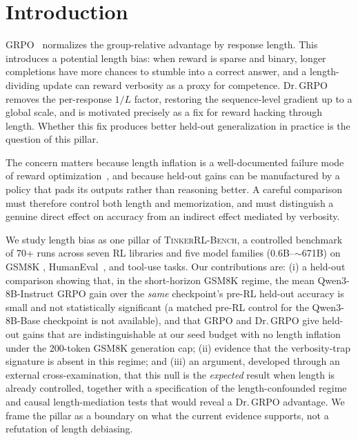 \documentclass{article}
\newcommand{\ours}{\textsc{TinkerRL-Bench}}
\begin{document}
\section{Introduction}
\label{sec:p4-intro}
GRPO~\citep{shao2024deepseekmath, guo2025deepseekr1} normalizes the group-relative
advantage by response length. This introduces a potential length bias: when reward
is sparse and binary, longer completions have more chances to stumble into a
correct answer, and a length-dividing update can reward verbosity as a proxy for
competence. Dr.\,GRPO~\citep{tong2025drgrpo} removes the per-response
$1/L$ factor, restoring the sequence-level gradient up to a global scale, and is
motivated precisely as a fix for reward hacking through length. Whether this fix
produces better held-out generalization in practice is the question of this pillar.

The concern matters because length inflation is a well-documented failure mode of
reward optimization~\citep{ouyang2022training, christiano2017deeprlhf}, and because
held-out gains can be manufactured by a policy that pads its outputs rather than
reasoning better. A careful comparison must therefore control both length and
memorization, and must distinguish a genuine direct effect on accuracy from an
indirect effect mediated by verbosity.

We study length bias as one pillar of \ours{}, a controlled benchmark of 70+ runs
across seven RL libraries and five model families ($0.6$B--$\sim$671B) on GSM8K
\citep{cobbe2021training}, HumanEval~\citep{chen2021codex}, and tool-use tasks. Our
contributions are: (i) a held-out comparison showing that, in the short-horizon
GSM8K regime, the mean Qwen3-8B-Instruct GRPO gain over the \emph{same} checkpoint's
pre-RL held-out accuracy is small and not statistically significant (a matched pre-RL
control for the Qwen3-8B-Base checkpoint is not available), and that GRPO and Dr.\,GRPO give held-out gains
that are indistinguishable at our seed budget with no length inflation under the
200-token GSM8K generation cap; (ii) evidence that the verbosity-trap signature is
absent in this regime; and (iii) an argument, developed through an external
cross-examination, that this null is the \emph{expected} result when length is
already controlled, together with a specification of the length-confounded regime
and causal length-mediation tests that would reveal a Dr.\,GRPO advantage. We frame
the pillar as a boundary on what the current evidence supports, not a refutation of
length debiasing.
\end{document}
